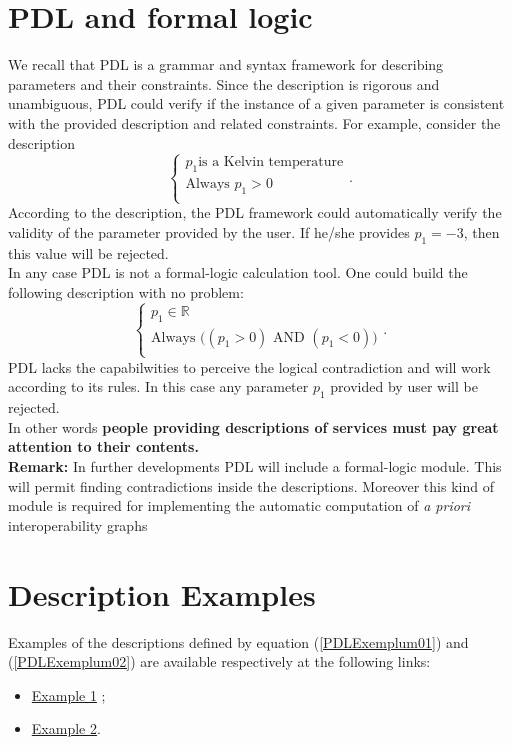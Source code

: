 \documentclass[a4paper,11pt] {ivoa}
\begin{document}
\section{PDL and formal logic}
We recall that PDL is a grammar and syntax framework for describing parameters and their
constraints. Since the description is rigorous and unambiguous, PDL could verify if the instance of
a given parameter is consistent with the provided description and related constraints. For example,
consider the description
\begin{equation}
\left\{
\begin{array}{l}
p_1 \mbox{is a Kelvin temperature}\\
\mbox{Always }  p_1 > 0 \\
\end{array}
\right..
\end{equation}
According to the description, the PDL framework could automatically verify the validity of the
parameter provided by the user.
If he/she provides $p_1=-3$, then this value will be rejected.\\
In any case PDL is not a formal-logic calculation tool. One could build the following description
with no problem:
\begin{equation}
\left\{
\begin{array}{l}
p_1 \in \mathbb R\\
\displaystyle \mbox{Always } \big(  (p_1 > 0) \mbox{ AND } (p_1 < 0) \big)\\
\end{array}
\right..
\end{equation}
PDL lacks the capabilwities to perceive the logical contradiction and will work according to its
rules. In this case any parameter $p_1$ provided by user will be rejected.\\
In other words {\bf people providing descriptions of services must pay great attention to their
contents.}\\

{\bf Remark:} In further developments PDL will include a formal-logic module. This will permit 
finding contradictions inside the descriptions. Moreover this kind of module is required for
implementing the automatic computation of
{\it a priori} interoperability graphs %

\section{Description Examples}
Examples of the descriptions defined by equation (\ref{PDLExemplum01}) and (\ref{PDLExemplum02}) are available respectively at the following links:
\begin{itemize}
\item \href{http://vo-param.googlecode.com/svn/trunk/model/documentation/PDL-Description_example01.xml}{Example 1} ;
\item \href{http://vo-param.googlecode.com/svn/trunk/model/documentation/PDL-Description_Example02.xml}{Example 2}.
\end{itemize}
\end{document}
